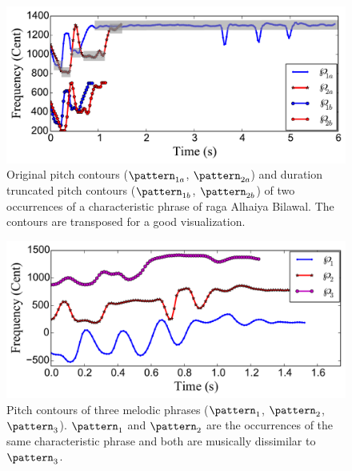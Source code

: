 \begin{figure}
	\begin{center}
		\includegraphics[width=\figSizeEightyFive]{ch06_patterns/figures/ImprovingSimilarity/Hindusani_flat_note_compression_example_reversed.pdf}
	\end{center}
	\caption[Example of melodic patterns after duration truncation]{Original pitch contours ($\pattern_{1a}$, $\pattern_{2a}$) and duration truncated pitch contours ($\pattern_{1b}$, $\pattern_{2b}$) of two occurrences of a characteristic phrase of \gls{raga} Alhaiya Bilawal. The contours are transposed for a good visualization.}
	\label{fig:flatCompressionExample}
\end{figure}

\begin{figure}
	\begin{center}
		\includegraphics[width=\figSizeEightyFive]{ch06_patterns/figures/ImprovingSimilarity/CarnaticComplexityExample.pdf}
	\end{center}
	\caption[Illustration of an erroneous case of melodic similarity in Carnatic music]{Pitch contours of three melodic phrases ($\pattern_1$, $\pattern_2$, $\pattern_3$). $\pattern_1$ and $\pattern_2$ are the occurrences of the same characteristic phrase and both are musically dissimilar to $\pattern_3$.} 
	\label{fig:carnaticComplexityExample}
\end{figure}

